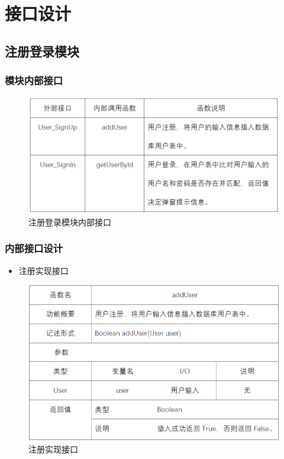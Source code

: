 \newpage
\section{接口设计}
\subsection{注册登录模块}
\subsubsection{模块内部接口}
\begin{figure}[!htbp]
	\centering
	\includegraphics[scale=0.75]{image/b1.png} %
	\caption{注册登录模块内部接口} %
\end{figure}
\subsubsection{内部接口设计}
\begin{itemize}
	\item 注册实现接口
\end{itemize}
\begin{figure}[!htbp]
	\centering
	\includegraphics[scale=0.75]{image/b2.png} %
	\caption{注册实现接口} %
\end{figure}

